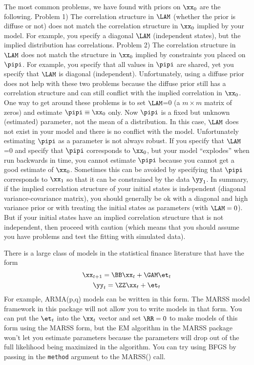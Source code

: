 The most common problems, we have found with priors on $\xx_0$ are the following.  Problem 1) The correlation structure in $\LAM$ (whether the prior is diffuse or not) does not match the correlation structure in $\xx_0$ implied by your model.  For example, you specify a diagonal $\LAM$ (independent states), but the implied distribution has correlations. Problem 2) The correlation structure in $\LAM$ does not match the structure in $\xx_0$ implied by constraints you placed on $\pipi$.  For example, you specify that all values in $\pipi$ are shared, yet you specify that $\LAM$ is diagonal (independent).  Unfortunately, using a diffuse prior does not help with these two problems because  the diffuse prior still has a correlation structure and can still conflict with the implied correlation in $\xx_0$.  One way to get around these problems is to set $\LAM$=0 (a $m \times m$ matrix of zeros) and estimate $\pipi \equiv \xx_0$ only.  Now $\pipi$ is a fixed but unknown (estimated) parameter, not the mean of a distribution.  In this case, $\LAM$ does not exist in your model and there is no conflict with the model.  Unfortunately estimating $\pipi$ as a parameter is not always robust. If you specify that $\LAM$=0 and specify that $\pipi$ corresponds to $\xx_0$, but your model ``explodes'' when run backwards in time, you cannot estimate $\pipi$ because you cannot get a good estimate of $\xx_0$.  Sometimes this can be avoided by specifying that $\pipi$ corresponds to $\xx_1$ so that it can be constrained by the data $\yy_1$. 
In summary, if the implied correlation structure of your initial states is independent (diagonal variance-covariance matrix), you should generally be ok with a diagonal and high variance prior or with treating the initial states as parameters (with $\LAM=0$).  But if your initial states have an implied correlation structure that is not independent, then proceed with caution (which means that you should assume you have problems and test the fitting with simulated data).

There is a large class of models in the statistical finance literature that have the form
\begin{equation*}
\begin{gathered}
\xx_{t+1} = \BB\xx_t + \GAM\et_t\\
\yy_t = \ZZ\xx_t  + \et_t\\
\end{gathered}
\end{equation*}
For example, ARMA(p,q) models can be written in this form.  The MARSS model framework in this package will not allow you to write models in that form.  You can put the $\et_t$ into the $\xx_t$ vector and set $\RR=0$ to make models of this form using the MARSS form, but the EM algorithm in the MARSS package won't let you estimate parameters because the parameters will drop out of the full likelihood being maximized in the algorithm.  You can try using BFGS by passing in the \texttt{method} argument to the MARSS() call.

